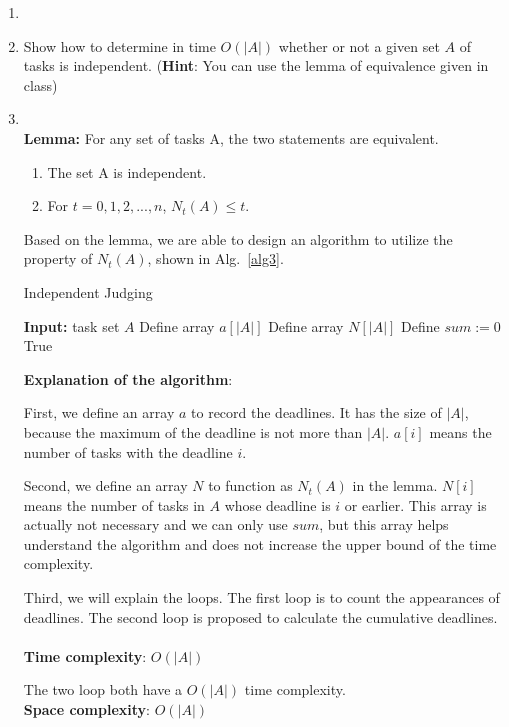 \documentclass[12pt,a4paper]{article}
\makeatletter
\newtheorem*{solution}{Solution}
\theoremstyle{definition}
\renewenvironment{solution}[1][Solution] {\par\pushQED{\qed}\normalfont\topsep6\p@\@plus6\p@\relax\trivlist\item[\hskip\labelsep\bfseries#1\@addpunct{.}]\ignorespaces}{\popQED\endtrivlist\@endpefalse} \makeatother
\makeatother
\begin{document}
\begin{enumerate}
\begin{enumerate}
\begin{solution}
	    \end{solution}
        \item Show how to determine in time $O(|A|)$ whether or not a given set $A$ of tasks is independent. (\textbf{Hint}: You can use the lemma of equivalence given in class)
 	       \begin{solution}
	       ~\\
	      \textbf{Lemma:} For any set of tasks A, the two statements are equivalent.
	      \begin{enumerate}
	      \item The set A is independent.
	      \item For $t=0,1,2,...,n$, $N_t(A)\leq t$.
	   \end{enumerate}
	   
	  Based on the lemma, we are able to design an algorithm to utilize the property of $N_t(A)$, shown in Alg.~\ref{alg3}.
		
		\begin{algorithm}[H]
   \caption{Independent Judging}\label{alg3}
		\textbf{Input:} task set $A$ \;
		Define array $a[|A|]$\;
		Define array $N[|A|]$\;
		Define $sum:=0$\;
		\Return True		
	\end{algorithm}


\textbf{Explanation of the algorithm}: 

First, we define an array $a$ to record the deadlines. It has the size of $|A|$, because the maximum of the deadline is not more than $|A|$. $a[i]$ means the number of tasks with the deadline $i$. 

Second, we define an array $N$ to function as $N_t(A)$ in the lemma. $N[i]$ means the number of tasks in $A$ whose deadline is $i$ or earlier. This array is actually not necessary and we can only use $sum$, but this array helps understand the algorithm and does not increase the upper bound of the time complexity.

Third, we will explain the loops. The first loop is to count the appearances of deadlines. The second loop is proposed to calculate the cumulative deadlines. 
~\\

\textbf{Time complexity}: $O(|A|)$

The two loop both have a $O(|A|)$ time complexity.
~\\

\textbf{Space complexity}: $O(|A|)$


\end{solution}
\end{enumerate}
\end{enumerate}
\end{document}
